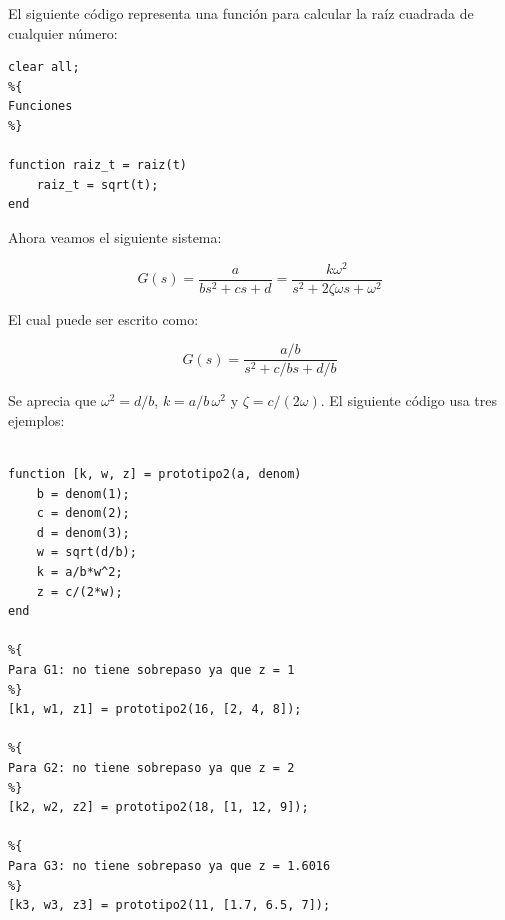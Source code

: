 El siguiente código representa una función para calcular la raíz cuadrada de cualquier número:


\begin{lstlisting}[caption = {}, label = {}]
clear all;
%{
Funciones
%}

function raiz_t = raiz(t)
    raiz_t = sqrt(t);
end
\end{lstlisting}



Ahora veamos el siguiente sistema:

\begin{equation}
    G(s) = \frac{a}{bs^2 + cs + d} = \frac{k\omega^2}{s^2 + 2\zeta\omega s + \omega^2}
\end{equation}


\noindent El cual puede ser escrito como:


\begin{equation}
    G(s) = \frac{a/b}{s^2 + c/b s + d/b}
\end{equation}


\noindent Se aprecia que $\omega^2 = d/b$, $k = a/b\, \omega^2 $ y $\zeta = c / (2\omega)$. El siguiente código usa tres ejemplos:

\begin{lstlisting}
    
function [k, w, z] = prototipo2(a, denom)
    b = denom(1);
    c = denom(2);
    d = denom(3);
    w = sqrt(d/b);
    k = a/b*w^2;
    z = c/(2*w);
end

%{
Para G1: no tiene sobrepaso ya que z = 1 
%}
[k1, w1, z1] = prototipo2(16, [2, 4, 8]); 

%{
Para G2: no tiene sobrepaso ya que z = 2
%}
[k2, w2, z2] = prototipo2(18, [1, 12, 9]); 

%{
Para G3: no tiene sobrepaso ya que z = 1.6016
%}
[k3, w3, z3] = prototipo2(11, [1.7, 6.5, 7]); 
\end{lstlisting}